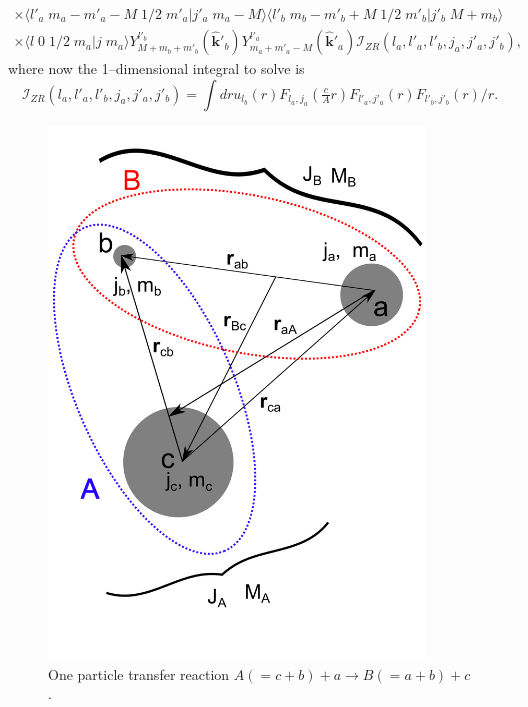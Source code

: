 \begin{subappendices}
\begin{multline}
\times \langle l'_a\;m_a-m'_a-M\;1/2\;m'_a|j'_a\;m_a-M\rangle \langle l'_b\;m_b-m'_b+M\;1/2\;m'_b|j'_b\;M+m_b\rangle\\
\times \langle l\;0\;1/2\;m_a|j\;m_a\rangle Y^{l'_b}_{M+m_b+m'_b} (\hat {\mathbf{k}}'_b)Y^{l'_a}_{m_a+m'_a-M} (\hat {\mathbf{k}}'_a)
\mathcal I_{ZR}(l_a,l'_a,l'_b,j_a,j'_a,j'_b),
\end{multline}
where now the 1--dimensional integral to solve is
\begin{equation}\label{eqC6AppG56}
\mathcal I_{ZR}(l_a,l'_a,l'_b,j_a,j'_a,j'_b)=\int dr u_{l_b}(r)F_{l_a,j_a}(\tfrac{c}{A}r)  F_{l'_a,j'_a}(r)F_{l'_b,j'_b}(r)/r.
\end{equation}
 \begin{figure}
\centerline{\includegraphics*[width=10cm,angle=0]{C6/figs_C6/onept.pdf}}
\vspace{-1cm}
\caption{One particle transfer reaction $A(=c+b)+a\rightarrow B(=a+b)+c$.}\label{fig6G4}
\end{figure}

\end{subappendices}
